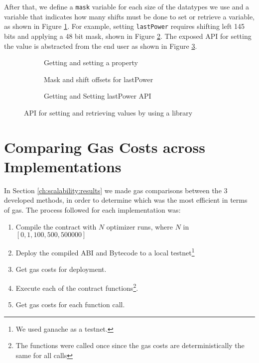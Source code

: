 

After that, we define a \texttt{mask} variable for each size of the datatypes we use and a variable that indicates how many shifts must be done to set or retrieve a variable, as shown in Figure \ref{fig:masking:a}. For example, setting \texttt{lastPower} requires shifting left 145 bits and applying a 48 bit mask, shown in Figure \ref{fig:masking:b}. The exposed API for setting the value is abstracted from the end user as shown in Figure \ref{fig:masking:c}.

\begin{figure}[H]
  \begin{subfigure}[b]{\textwidth}
    \centering
    
    \caption{Getting and setting a property}
    \label{fig:masking:a}
  \end{subfigure}

  \begin{subfigure}[b]{\textwidth}
    \centering
    
   \caption{Mask and shift offsets for lastPower}
    \label{fig:masking:b}
  \end{subfigure}

  \begin{subfigure}[b]{\textwidth}
    \centering
    
    \caption{Getting and Setting lastPower API}
    \label{fig:masking:c}
  \end{subfigure}

  \caption{API for setting and retrieving values by using a library}
  \label{apx:scalability:lib}
\end{figure}

\section{Comparing Gas Costs across Implementations}

In Section \ref{ch:scalability:results} we made gas comparisons between the 3 developed methods, in order to determine which was the most efficient in terms of gas. The process followed for each implementation was:

\begin{enumerate}
  \item Compile the contract with $N$ optimizer runs, where $N$ in $[0, 1, 100, 500, 500000]$ 
  \item Deploy the compiled ABI and Bytecode to a local testnet\footnote{We used ganache as a testnet.}
  \item Get gas costs for deployment.
  \item Execute each of the contract functions\footnote{The functions were called once since the gas costs are deterministically the same for all calls}.
  \item Get gas costs for each function call.
\end{enumerate}

